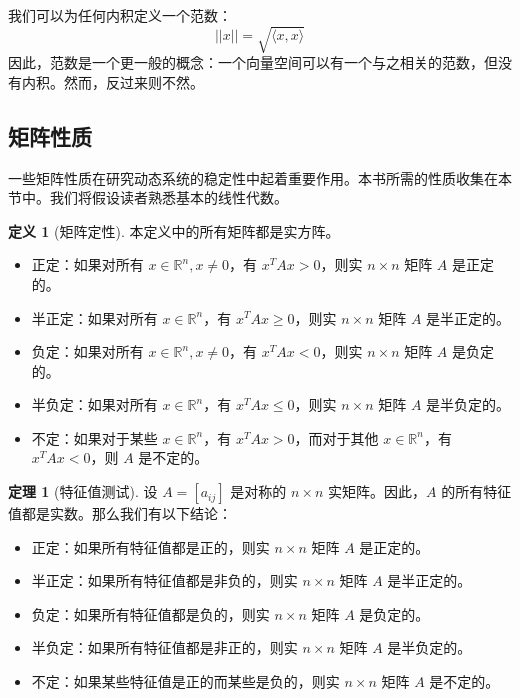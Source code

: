 \documentclass[UTF8,12pt,a4paper]{ctexart}
\theoremstyle{definition}
\newtheorem{definition}{定义}[section]
\newtheorem{theorem}{定理}[section]
\begin{document}
我们可以为任何内积定义一个范数：
\[
||x|| = \sqrt{\langle x, x \rangle}
\]
因此，范数是一个更一般的概念：一个向量空间可以有一个与之相关的范数，但没有内积。然而，反过来则不然。

\subsection{矩阵性质}

一些矩阵性质在研究动态系统的稳定性中起着重要作用。本书所需的性质收集在本节中。我们将假设读者熟悉基本的线性代数。

\begin{definition}[矩阵定性]
本定义中的所有矩阵都是实方阵。
\begin{itemize}
\item 正定：如果对所有 $x \in \mathbb{R}^n, x \neq 0$，有 $x^T A x > 0$，则实 $n \times n$ 矩阵 $A$ 是正定的。
\item 半正定：如果对所有 $x \in \mathbb{R}^n$，有 $x^T A x \geq 0$，则实 $n \times n$ 矩阵 $A$ 是半正定的。
\item 负定：如果对所有 $x \in \mathbb{R}^n, x \neq 0$，有 $x^T A x < 0$，则实 $n \times n$ 矩阵 $A$ 是负定的。
\item 半负定：如果对所有 $x \in \mathbb{R}^n$，有 $x^T A x \leq 0$，则实 $n \times n$ 矩阵 $A$ 是半负定的。
\item 不定：如果对于某些 $x \in \mathbb{R}^n$，有 $x^T A x > 0$，而对于其他 $x \in \mathbb{R}^n$，有 $x^T A x < 0$，则 $A$ 是不定的。
\end{itemize}
\end{definition}

\begin{theorem}[特征值测试]
设 $A=[a_{ij}]$ 是对称的 $n \times n$ 实矩阵。因此，$A$ 的所有特征值都是实数。那么我们有以下结论：
\begin{itemize}
\item 正定：如果所有特征值都是正的，则实 $n \times n$ 矩阵 $A$ 是正定的。
\item 半正定：如果所有特征值都是非负的，则实 $n \times n$ 矩阵 $A$ 是半正定的。
\item 负定：如果所有特征值都是负的，则实 $n \times n$ 矩阵 $A$ 是负定的。
\item 半负定：如果所有特征值都是非正的，则实 $n \times n$ 矩阵 $A$ 是半负定的。
\item 不定：如果某些特征值是正的而某些是负的，则实 $n \times n$ 矩阵 $A$ 是不定的。
\end{itemize}
\end{theorem}
\end{document}

